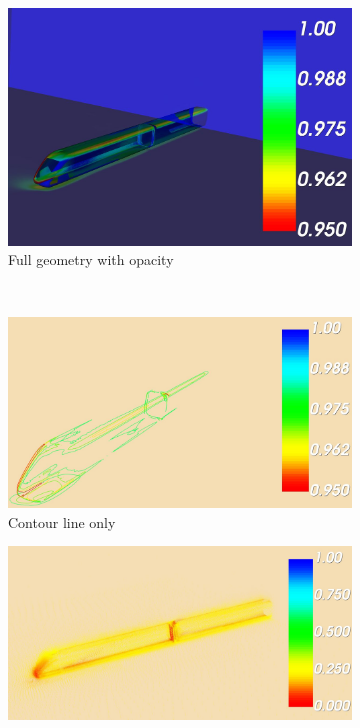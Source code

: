 \documentclass[
	12pt, %
]{fphw}
\begin{document}
\begin{enumerate}[(\itshape 1\normalfont)]
\begin{figure}[h]
    \centering
    \begin{subfigure}[h]{0.4\textwidth}
        \includegraphics[width=\textwidth]{4a.jpg}
        \caption{Full geometry with opacity}
        \label{fig:1c1}
    \end{subfigure}
    ~ 
    \begin{subfigure}[h]{0.4\textwidth}
        \includegraphics[width=\textwidth]{4b.jpg}
        \caption{Contour line only}
        \label{fig:1c1}
    \end{subfigure}
    \caption{ParaView Measurement}\label{fig:1c}
     \begin{subfigure}[h]{0.4\textwidth}
        \includegraphics[width=\textwidth]{4c.jpg}

\end{subfigure}
\end{figure}
\end{enumerate}
\end{document}
